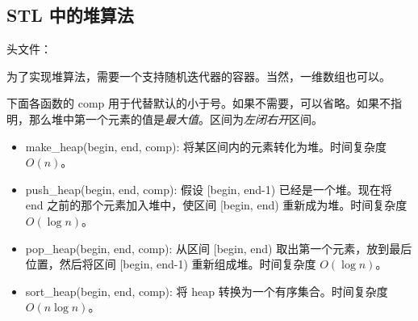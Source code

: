 \subsection{STL 中的堆算法}
	头文件：

	为了实现堆算法，需要一个支持随机迭代器的容器。当然，一维数组也可以。

	下面各函数的 comp 用于代替默认的小于号。如果不需要，可以省略。如果不指明，那么堆中第一个元素的值是\emph{最大值}。区间为\emph{左闭右开}区间。
	
	\begin{itemize}
		\item make\_{}heap(begin, end, comp): 将某区间内的元素转化为堆。时间复杂度 $O(n)$。
		\item push\_{}heap(begin, end, comp): 假设 [begin, end-1) 已经是一个堆。现在将 end 之前的那个元素加入堆中，使区间 [begin, end) 重新成为堆。时间复杂度 $O(\log n)$。
		\item pop\_{}heap(begin, end, comp): 从区间 [begin, end) 取出第一个元素，放到最后位置，然后将区间 [begin, end-1) 重新组成堆。时间复杂度 $O(\log n)$。
		\item sort\_{}heap(begin, end, comp): 将 heap 转换为一个有序集合。时间复杂度 $O(n\log n)$。
	\end{itemize}